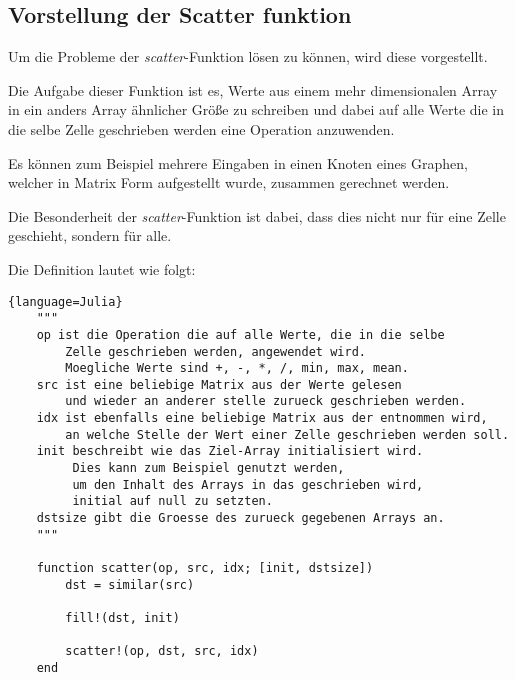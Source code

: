 \subsection{Vorstellung der Scatter funktion} \label{sec:vorstellung}

Um die Probleme der \textit{scatter}-Funktion lösen zu können, 
wird diese vorgestellt.

Die Aufgabe dieser Funktion ist es, Werte aus einem mehr dimensionalen Array 
in ein anders Array ähnlicher Größe zu schreiben 
und dabei auf alle Werte die in die selbe Zelle geschrieben werden eine Operation anzuwenden.


Es können zum Beispiel mehrere Eingaben in einen Knoten eines Graphen, 
welcher in Matrix Form aufgestellt wurde,
zusammen gerechnet werden.

Die Besonderheit der \textit{scatter}-Funktion ist dabei, 
dass dies nicht nur für eine Zelle geschieht, sondern für alle.

Die Definition lautet wie folgt:

\begin{lstlisting}{language=Julia}
	"""
	op ist die Operation die auf alle Werte, die in die selbe 
	    Zelle geschrieben werden, angewendet wird.
		Moegliche Werte sind +, -, *, /, min, max, mean.
	src ist eine beliebige Matrix aus der Werte gelesen 
	    und wieder an anderer stelle zurueck geschrieben werden.
	idx ist ebenfalls eine beliebige Matrix aus der entnommen wird,
	    an welche Stelle der Wert einer Zelle geschrieben werden soll.
	init beschreibt wie das Ziel-Array initialisiert wird.
	     Dies kann zum Beispiel genutzt werden, 
		 um den Inhalt des Arrays in das geschrieben wird, 
		 initial auf null zu setzten.
	dstsize gibt die Groesse des zurueck gegebenen Arrays an.
	"""

	function scatter(op, src, idx; [init, dstsize])
		dst = similar(src)
		
		fill!(dst, init)
		
		scatter!(op, dst, src, idx)
	end
\end{lstlisting}

